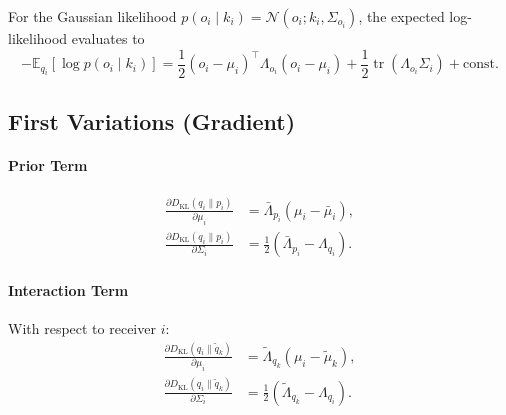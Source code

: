 For the Gaussian likelihood $p(o_i \mid k_i) = \mathcal{N}(o_i; k_i, \Sigma_{o_i})$, the expected log-likelihood evaluates to
\begin{equation}
-\mathbb{E}_{q_i}[\log p(o_i \mid k_i)] = \frac{1}{2}(o_i - \mu_i)^\top \Lambda_{o_i}(o_i - \mu_i) + \frac{1}{2}\operatorname{tr}(\Lambda_{o_i}\Sigma_i) + \mathrm{const}.
\end{equation}

\subsection{First Variations (Gradient)}

\paragraph{Prior Term}
\begin{align}
\frac{\partial D_{\mathrm{KL}}(q_i \| p_i)}{\partial \mu_i} &= \bar{\Lambda}_{p_i}(\mu_i - \bar{\mu}_i), \\
\frac{\partial D_{\mathrm{KL}}(q_i \| p_i)}{\partial \Sigma_i} &= \frac{1}{2}(\bar{\Lambda}_{p_i} - \Lambda_{q_i}).
\end{align}

\paragraph{Interaction Term}

With respect to receiver $i$:
\begin{align}
\frac{\partial D_{\mathrm{KL}}(q_i \| \tilde{q}_k)}{\partial \mu_i} &= \tilde{\Lambda}_{q_k}(\mu_i - \tilde{\mu}_k), \\
\frac{\partial D_{\mathrm{KL}}(q_i \| \tilde{q}_k)}{\partial \Sigma_i} &= \frac{1}{2}(\tilde{\Lambda}_{q_k} - \Lambda_{q_i}).
\end{align}

